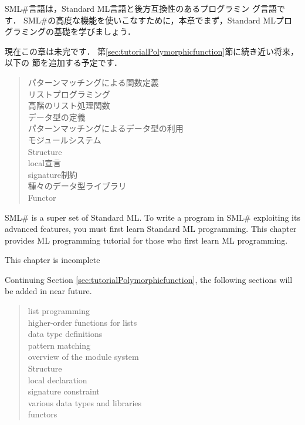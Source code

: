 \documentclass{jbook}
\newcommand{\smlsharp}{SML\#}
\begin{document}
\ifx\jp%
	\smlsharp{}言語は，Standard ML言語と後方互換性のあるプログラミン
グ言語です．
	\smlsharp{}の高度な機能を使いこなすために，本章でまず，Standard
MLプログラミングの基礎を学びましょう．

現在この章は未完です．
第\ref{sec:tutorialPolymorphicfunction}節に続き近い将来，以下の
節を追加する予定です．
\begin{quote}
パターンマッチングによる関数定義\\
リストプログラミング\\
高階のリスト処理関数\\
データ型の定義\\
パターンマッチングによるデータ型の利用\\
モジュールシステム\\
Structure\\
local宣言\\
signature制約\\
種々のデータ型ライブラリ\\
Functor
\end{quote}
\else%
	\smlsharp{} is a super set of Standard ML.
	To write a program in \smlsharp{} exploiting its advanced
features, you must first learn Standard ML programming.
	This chapter provides ML programming tutorial for those who
first learn ML programming.

\begin{small}
This chapter is incomplete

Continuing Section \ref{sec:tutorialPolymorphicfunction}, the following 
sections will be added in near future.
\begin{quote}
list programming\\
higher-order functions for lists\\
data type definitions\\
pattern matching \\
overview of the module system\\
Structure\\
local declaration\\
signature constraint\\
various data types and libraries\\
functors
\end{quote}
\end{small}
\fi%
\end{document}
